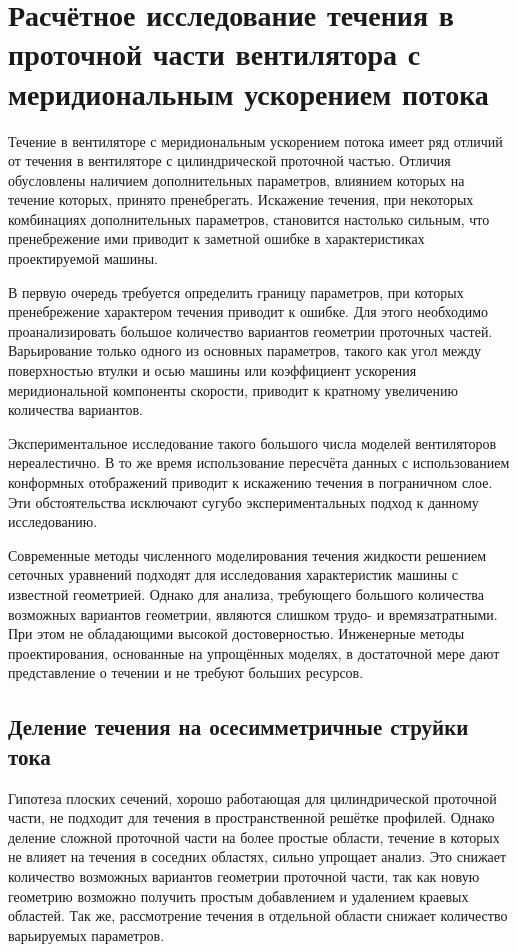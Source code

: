 \setcounter{chapter}{1}
\chapter{Расчётное исследование течения в проточной части вентилятора с меридиональным ускорением потока}

Течение в вентиляторе с меридиональным ускорением потока имеет ряд отличий от течения в вентиляторе с цилиндрической проточной частью. Отличия обусловлены наличием дополнительных параметров, влиянием которых на течение которых, принято пренебрегать. Искажение течения, при некоторых комбинациях дополнительных параметров, становится настолько сильным, что пренебрежение ими приводит к заметной ошибке в характеристиках проектируемой машины. 

В первую очередь требуется определить границу параметров, при которых пренебрежение характером течения приводит к ошибке. Для этого необходимо проанализировать большое количество вариантов геометрии проточных частей. Варьирование только одного из основных параметров, такого как угол между поверхностью втулки и осью машины или коэффициент ускорения меридиональной компоненты скорости, приводит к кратному увеличению количества вариантов.

Экспериментальное исследование такого большого числа моделей вентиляторов нереалестично. В то же время использование пересчёта данных с использованием конформных отображений приводит к искажению течения в пограничном слое. Эти обстоятельства исключают сугубо экспериментальных подход к данному исследованию.

Современные методы численного моделирования течения жидкости решением сеточных уравнений подходят для исследования характеристик машины с известной геометрией. Однако для анализа, требующего  большого количества возможных вариантов геометрии, являются слишком трудо- и времязатратными. При этом не обладающими высокой достоверностью. 
Инженерные методы проектирования, основанные на упрощённых моделях, в достаточной мере дают представление о течении и не требуют больших ресурсов.

\section{Деление течения на осесимметричные струйки тока}

Гипотеза плоских сечений, хорошо работающая для цилиндрической проточной части, не подходит для течения в пространственной решётке профилей. Однако деление сложной проточной части на более простые области, течение в которых не влияет на течения в соседних областях, сильно упрощает анализ. Это снижает количество возможных вариантов геометрии проточной части, так как новую геометрию возможно получить простым добавлением и удалением краевых областей. Так же, рассмотрение течения в отдельной области снижает количество варьируемых параметров.

